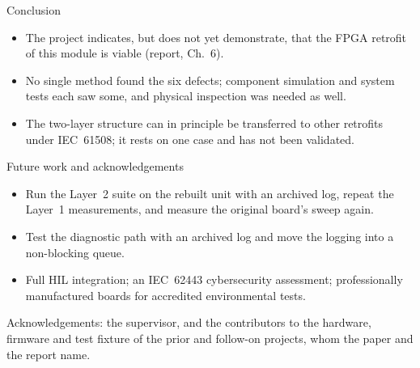\begin{frame}{Conclusion}
  \begin{itemize}
    \item The project indicates, but does not yet demonstrate, that the FPGA retrofit of this module is viable (report, Ch.~6).
    \item No single method found the six defects; component simulation and system tests each saw some, and physical inspection was needed as well.
    \item The two-layer structure can in principle be transferred to other retrofits under IEC~61508; it rests on one case and has not been validated.
  \end{itemize}
\end{frame}

\begin{frame}{Future work and acknowledgements}
  \begin{itemize}
    \item Run the Layer~2 suite on the rebuilt unit with an archived log, repeat the Layer~1 measurements, and measure the original board's sweep again.
    \item Test the diagnostic path with an archived log and move the logging into a non-blocking queue.
    \item Full HIL integration; an IEC~62443 cybersecurity assessment; professionally manufactured boards for accredited environmental tests.
  \end{itemize}
  \vfill
  \footnotesize Acknowledgements: the supervisor, and the contributors to the hardware, firmware and test fixture of the prior and follow-on projects, whom the paper and the report name.
  \vfill
  \begin{center}\end{center}
\end{frame}
